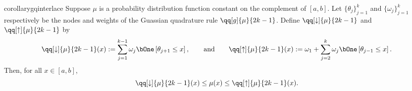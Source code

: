 \begin{restatable}{corollary}{gqinterlace}
\label{thm:gq_interlace}
Suppose \( \mu \) is a probability distribution function constant on the complement of \( [a,b] \). %
Let \( \{ \theta_j \}_{j=1}^{k} \) and \( \{ \omega_j \}_{j=1}^{k} \) respectively be the nodes and weights of the Guassian quadrature rule \( \qq[g]{\mu}{2k-1} \).
Define \( \qq[\downarrow]{\mu}{2k-1} \) and \( \qq[\uparrow]{\mu}{2k-1} \) by
\begin{equation*}
    \qq[\downarrow]{\mu}{2k-1}(x)
    := \sum_{j=1}^{k-1} \omega_{j} \bOne\left[ \theta_{j+1} \leq x \right]
    ,\qquad\text{and}\qquad
    \qq[\uparrow]{\mu}{2k-1}(x)
    := \omega_1 + \sum_{j=2}^{k} \omega_{j} \bOne\left[\theta_{j-1} \leq x \right].
\end{equation*}
    Then, for all \( x \in [a,b] \),
\begin{equation*}
    \qq[\downarrow]{\mu}{2k-1}(x)
    \leq \mu(x) 
    \leq \qq[\uparrow]{\mu}{2k-1}(x).
\end{equation*}
\end{restatable}


